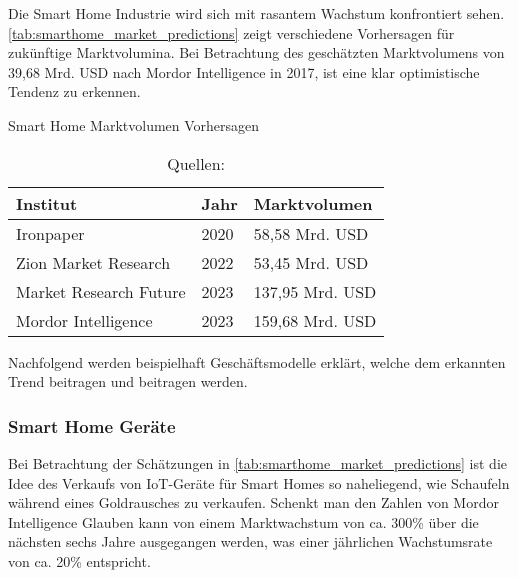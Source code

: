 Die Smart Home Industrie wird sich mit rasantem Wachstum konfrontiert sehen.
\autoref{tab:smarthome_market_predictions} zeigt verschiedene Vorhersagen für zukünftige Marktvolumina.
Bei Betrachtung des geschätzten Marktvolumens von 39,68 Mrd. USD nach Mordor Intelligence  in 2017, ist eine klar optimistische Tendenz zu erkennen.

\begin{table}[ht]
	\caption{Smart Home Marktvolumen Vorhersagen}
	\centering
	\begin{tabular}{| p{} | p{} | p{} |}
		\hline
		\textbf{Institut} 	& \textbf{Jahr} & \textbf{Marktvolumen} \\ \hline
		Ironpaper & 2020 & 58,58 Mrd. USD \\ \hline
		Zion Market Research & 2022 & 53,45 Mrd. USD \\ \hline
		Market Research Future & 2023 & 137,95 Mrd. USD \\ \hline
		Mordor Intelligence & 2023 & 159,68 Mrd. USD \\ \hline
	\end{tabular}
	\caption*{\footnotesize{Quellen: }}
	\label{tab:smarthome_market_predictions}
\end{table}

Nachfolgend werden beispielhaft Geschäftsmodelle erklärt, welche dem erkannten Trend beitragen und beitragen werden.

\subsubsection{Smart Home Geräte}

Bei Betrachtung der Schätzungen in \autoref{tab:smarthome_market_predictions} ist die Idee des Verkaufs von \ac{IoT}-Geräte für Smart Homes so naheliegend, wie Schaufeln während eines Goldrausches zu verkaufen.
Schenkt man den Zahlen von Mordor Intelligence Glauben kann von einem Marktwachstum von ca. 300\% über die nächsten sechs Jahre ausgegangen werden, was einer jährlichen Wachstumsrate von ca. 20\% entspricht.

